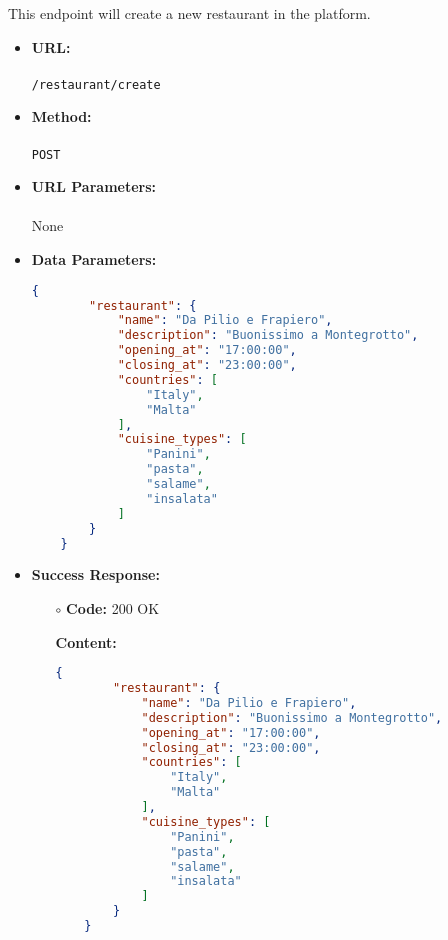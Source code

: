 

This endpoint will create a new restaurant in the platform.

\begin{itemize}
    \item \textbf{URL:} \\\\\texttt{/restaurant/create}
    \item \textbf{Method:} \\\\\texttt{POST}
    \item \textbf{URL Parameters:} \\\\None
    \item \textbf{Data Parameters:}
	\begin{lstlisting}[language=json]
	{
	    "restaurant": {
	        "name": "Da Pilio e Frapiero",
	        "description": "Buonissimo a Montegrotto",
	        "opening_at": "17:00:00",
	        "closing_at": "23:00:00",
	        "countries": [
	            "Italy",
	            "Malta"
	        ],
	        "cuisine_types": [
	            "Panini",
	            "pasta",
	            "salame",
	            "insalata"
	        ]
	    }
	}
	\end{lstlisting}
    \item \textbf{Success Response:}
		\begin{itemize}
			\item[$\circ$] \textbf{Code:} 200 OK
			\item[] \textbf{Content:}
			\begin{lstlisting}[language=json]
	{
		"restaurant": {
			"name": "Da Pilio e Frapiero",
			"description": "Buonissimo a Montegrotto",
			"opening_at": "17:00:00",
			"closing_at": "23:00:00",
			"countries": [
				"Italy",
				"Malta"
			],
			"cuisine_types": [
				"Panini",
				"pasta",
				"salame",
				"insalata"
			]
		}
	}
			\end{lstlisting}
		\end{itemize}
	

\end{itemize}
